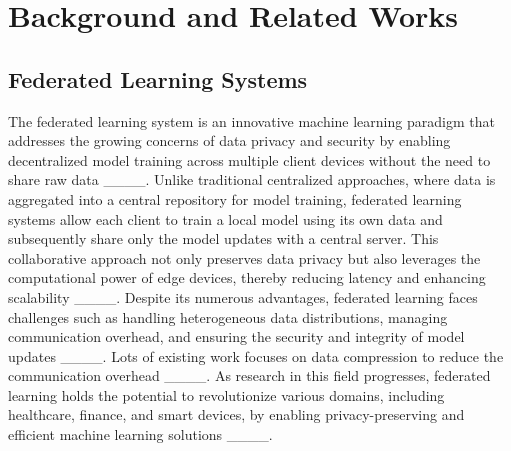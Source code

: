 \section{Background and Related Works}


\subsection{Federated Learning Systems}

The federated learning system is an innovative machine learning paradigm that addresses the growing concerns of data privacy and security by enabling decentralized model training across multiple client devices without the need to share raw data ____. Unlike traditional centralized approaches, where data is aggregated into a central repository for model training, federated learning systems allow each client to train a local model using its own data and subsequently share only the model updates with a central server. This collaborative approach not only preserves data privacy but also leverages the computational power of edge devices, thereby reducing latency and enhancing scalability ____. Despite its numerous advantages, federated learning faces challenges such as handling heterogeneous data distributions, managing communication overhead, and ensuring the security and integrity of model updates ____. Lots of existing work focuses on data compression to reduce the communication overhead ____. As research in this field progresses, federated learning holds the potential to revolutionize various domains, including healthcare, finance, and smart devices, by enabling privacy-preserving and efficient machine learning solutions ____.


